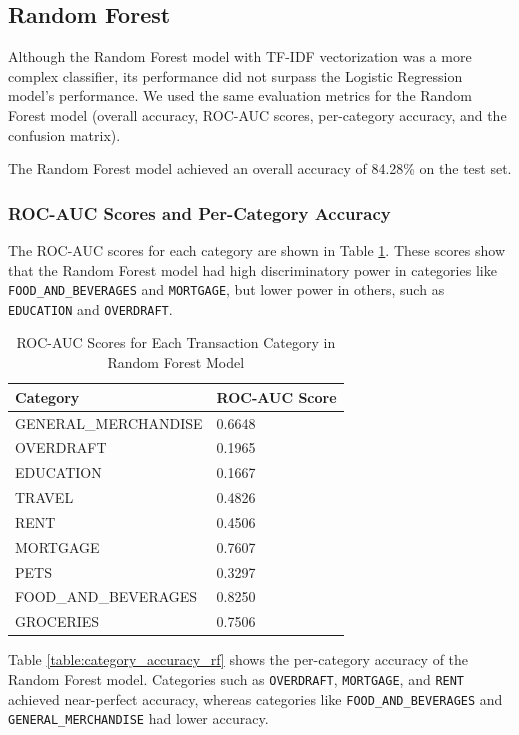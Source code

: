 \documentclass[12pt,letterpaper]{article}
\begin{document}
\subsection{Random Forest}

Although the Random Forest model with TF-IDF vectorization was a more complex classifier, its performance did not surpass the Logistic Regression model's performance. We used the same evaluation metrics for the Random Forest model (overall accuracy, ROC-AUC scores, per-category accuracy, and the confusion matrix).

The Random Forest model achieved an overall accuracy of 84.28\% on the test set.

\subsubsection{ROC-AUC Scores and Per-Category Accuracy}
The ROC-AUC scores for each category are shown in Table \ref{table:roc_auc_rf}. These scores show that the Random Forest model had high discriminatory power in categories like \texttt{FOOD\_AND\_BEVERAGES} and \texttt{MORTGAGE}, but lower power in others, such as \texttt{EDUCATION} and \texttt{OVERDRAFT}.

\begin{table}[h]
    \centering
    \begin{tabular}{ll}
        \hline
        \textbf{Category} & \textbf{ROC-AUC Score} \\
        \hline
        GENERAL\_MERCHANDISE & 0.6648 \\
        OVERDRAFT & 0.1965 \\
        EDUCATION & 0.1667 \\
        TRAVEL & 0.4826 \\
        RENT & 0.4506 \\
        MORTGAGE & 0.7607 \\
        PETS & 0.3297 \\
        FOOD\_AND\_BEVERAGES & 0.8250 \\
        GROCERIES & 0.7506 \\
        \hline
    \end{tabular}
    \caption{ROC-AUC Scores for Each Transaction Category in Random Forest Model}
    \label{table:roc_auc_rf}
\end{table}

Table \ref{table:category_accuracy_rf} shows the per-category accuracy of the Random Forest model. Categories such as \texttt{OVERDRAFT}, \texttt{MORTGAGE}, and \texttt{RENT} achieved near-perfect accuracy, whereas categories like \texttt{FOOD\_AND\_BEVERAGES} and \texttt{GENERAL\_MERCHANDISE} had lower accuracy.
\end{document}
